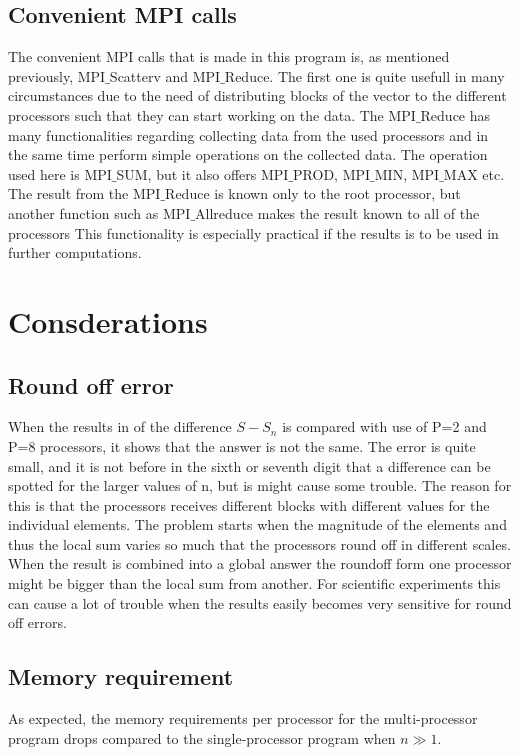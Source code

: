\documentclass[12p]{article}
\begin{document}
\subsection{Convenient MPI calls}
The convenient MPI calls that is made in this program is, as mentioned previously, MPI$\_$Scatterv and MPI$\_$Reduce. The first one is quite usefull in many circumstances due to the need of distributing blocks of the vector to the different processors such that they can start working on the data. The MPI$\_$Reduce has many functionalities regarding collecting data from the used processors and in the same time perform simple operations on the collected data. The operation used here is MPI$\_$SUM, but it also offers MPI$\_$PROD, MPI$\_$MIN, MPI$\_$MAX etc. The result from the MPI$\_$Reduce is known only to the root processor, but another function such as MPI$\_$Allreduce makes the result known to all of the processors This functionality is especially practical if the results is to be used in further computations.

\section{Consderations}

\subsection{Round off error}
When the results in of the difference $S − S_n$ is compared with use of P=2 and P=8 processors, it shows that the answer is not the same. The error is quite small, and it is not before in the sixth or seventh digit that a difference
can be spotted for the larger values of n, but is might cause some trouble. The reason for this is that the processors receives different blocks with different values for the individual elements. The problem starts when the magnitude of the elements and thus the local sum varies so much that the processors round off in different scales. When the result is combined into a global answer the roundoff form one processor might be bigger than the local sum from another. For scientific experiments this can cause a lot of trouble when the results easily becomes very sensitive for round off errors.

\subsection{Memory requirement}
As expected, the memory requirements per processor for the multi-processor
program drops compared to the single-processor program when $n \gg 1$.
\end{document}
